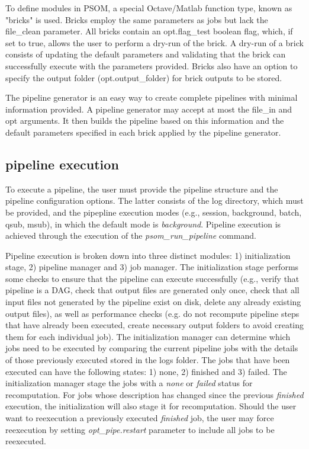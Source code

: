 \documentclass{report}
\begin{document}
        To define modules in PSOM, a special Octave/Matlab function type, known as "bricks"
is used. Bricks employ the same parameters as jobs but lack the file\_clean
parameter. All bricks contain an opt.flag\_test boolean flag, which, if set to
true, allows the user to perform a dry-run of the brick. A dry-run of a brick
consists of updating the default parameters and validating that the brick can
successfully execute with the parameters provided. Bricks also have an option to
specify the output folder (opt.output\_folder) for brick outputs to be stored.

        The pipeline generator is an easy way to create complete pipelines with
minimal information provided. A pipeline generator may accept at most the
file\_in and opt arguments. It then builds the pipeline based on this
information and the default parameters specified in each brick applied by the
pipeline generator.

        \subsection{pipeline execution}
        
        To execute a pipeline, the user must provide the pipeline structure and
the pipeline configuration options. The latter consists of the log
directory, which must be provided, and the pipepline execution modes (e.g., session, background, batch,
qsub, msub), in which the default mode is \textit{background}. Pipeline
execution is achieved through the execution of the \textit{psom\_run\_pipeline}
command. 

        Pipeline execution is broken down into three distinct modules: 1)
initialization stage, 2) pipeline manager and 3) job manager. The initialization
stage performs some checks to ensure that the pipeline can execute successfully
(e.g., verify that pipeline is a DAG, check that output files are generated only
once, check that all input files not generated by the pipeline exist on disk,
delete any already existing output files), as well as performance checks (e.g.
do not recompute pipeline steps that have already been executed, create
necessary output folders to avoid creating them for each individual job). The
initialization manager can determine which jobs need to be executed by comparing
the current pipeline jobs with the details of those previously executed stored
in the logs folder. The jobs that have been executed can have the following
states: 1) none, 2) finished and 3) failed. The initialization manager stage the jobs 
with a \textit{none} or \textit{failed} status for recomputation. For jobs whose
description has changed since the previous \textit{finished} execution, the
initialization will also stage it for recomputation. Should the user want to
reexecution a previously executed \textit{finished} job, the user may force
reexecution by setting \textit{opt\_pipe.restart} parameter to include all jobs
to be reexecuted.
\end{document}
